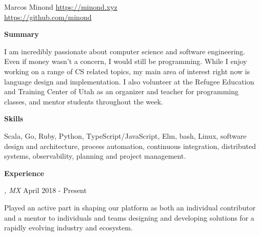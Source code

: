\documentclass[10pt]{article}
\newcommand{\SectionTitle}[1] {
  \vspace{.25in}
  \textbf{\large #1}
  \vspace{.1in}
}
\newcommand{\DescribedEntry}[4] {
  \noindent \textit{\strong{#1}, #2} \hfill #3
  \vspace{.05in}

  #4
}
\begin{document}
\begin{flushleft}

\huge{Marcos Minond} \normalsize
  \hfill \href{https://minond.xyz}{https://minond.xyz} \\
  \hfill \href{https://github.com/minond}{https://github.com/minond}

\normalsize


\SectionTitle{Summary}

I am incredibly passionate about computer science and software engineering.
Even if money wasn’t a concern, I would still be programming. While I enjoy
working on a range of CS related topics, my main area of interest right
now is language design and implementation. I also volunteer at the Refugee
Education and Training Center of Utah as an organizer and teacher for
programming classes, and mentor students throughout the week.


\SectionTitle{Skills}

Scala, Go, Ruby, Python, TypeScript/JavaScript, Elm, bash, Linux, software
design and architecture, process automation, continuous integration,
distributed systems, observability, planning and project management.


\SectionTitle{Experience}

\DescribedEntry{Staff Engineer}{MX}{April 2018 - Present}{
Played an active part in shaping our platform as both an individual contributor and a mentor to individuals and teams designing and developing solutions for a rapidly evolving industry and ecosystem.

}
\end{flushleft}
\end{document}
